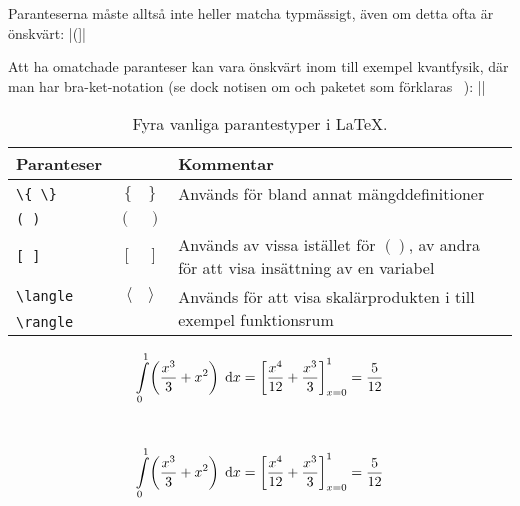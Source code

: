 \documentclass[../../a4.tex]{subfiles}
\begin{document}
Paranteserna måste alltså inte heller matcha typmässigt, även om detta
ofta är önskvärt:
\latex|\left(\right]|

Att ha omatchade paranteser kan vara önskvärt inom till exempel
kvantfysik, där man har bra-ket-notation (se dock notisen om 
 och paketet  som förklaras~%
):
\latex|\left\langle\psi\right\vert|

\begin{table}[t]
	\centering 
	\caption{Fyra vanliga parantestyper i \LaTeX.}
	\label{tab:paranteser}
	\begin{tabular}{lcp{}}
		\toprule 
		Paranteser & & Kommentar \\
		\midrule 
		\verb|\{ \}| & \(\{\quad\}\) & Används för bland annat 
		mängddefinitioner \\
		\texttt{( )} & \( (\quad) \) & \\
		\texttt{[ ]} & \( [\quad] \) & Används av vissa istället för 
		\(()\), av andra för att visa insättning av en variabel\\
		\verb|\langle| & \(\langle\quad\rangle\) &
		\multirow{2}{0.5\textwidth}{Används för att visa skalärprodukten i
		till exempel funktionsrum}\\
		\verb|\rangle| & & \\
		\bottomrule 
	\end{tabular}
\end{table}

\begin{kod}[tbp]
	\centering 
	\begin{minipage}{0.85\textwidth}
		\begin{latexcode}
\begin{equation*}
\int\limits_0^1\!\left(\dfrac{x^3}{3} +
x^2\right)\d{x} = \left[\dfrac{x^4}{12} +
\dfrac{x^3}{3}\right]_{x=0}^1 = \dfrac{5}{12}
\end{equation*}
		\end{latexcode}
	\end{minipage}
	\\
	\begin{equation*}
		\displaystyle\int\limits_0^1\!\left(\dfrac{x^3}{3} +
		x^2\right)\d{x} = \left[\dfrac{x^4}{12} + 
		\dfrac{x^3}{3}\right]_{x=0}^1 = \dfrac{5}{12}
	\end{equation*}
	\caption{Skalbara paranteser med  och .}
	\label{ex:paranteser}
\end{kod}
\end{document}
